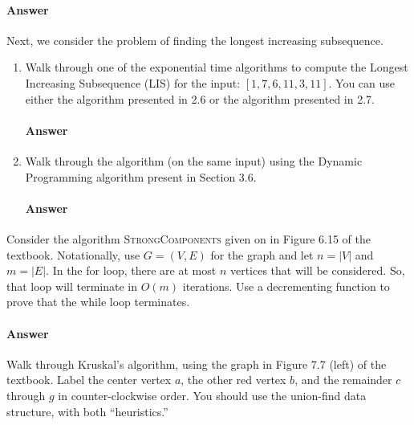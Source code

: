 \documentclass{article}
\begin{document}
\paragraph{Answer}
\todo{}

\collab{\todo{}}

Next, we consider the problem of finding the longest increasing subsequence.

\begin{enumerate}
    \item
        Walk through one of the exponential time algorithms to compute the
        Longest Increasing Subsequence (LIS) for the input: $\left[ 1, 7, 6, 11,
        3, 11 \right]$.  You can use either the algorithm presented in 2.6 or
        the algorithm presented in 2.7.

        \paragraph{Answer} \todo{}

    \item
        Walk through the algorithm (on the same input) using the Dynamic Programming algorithm
        present in Section 3.6.

        \paragraph{Answer} \todo{}

\end{enumerate}

\collab{\todo{}}

Consider the algorithm \textsc{StrongComponents} given on in Figure 6.15 of the
textbook. Notationally, use $G=(V,E)$ for the graph and let $n=|V|$ and $m=|E|$.
In the for loop, there are at most $n$ vertices that will be
considered. So, that loop will terminate in $O(m)$ iterations.
Use a decrementing function to prove that the while loop terminates.

\paragraph{Answer}
\todo{}

\collab{\todo{}}

Walk through Kruskal's algorithm, using the graph in Figure 7.7 (left) of the
textbook.  Label the center vertex $a$, the other red vertex $b$, and the
remainder $c$ through $g$ in counter-clockwise order.  You should use the
union-find data structure, with both ``heuristics.''
\end{document}
